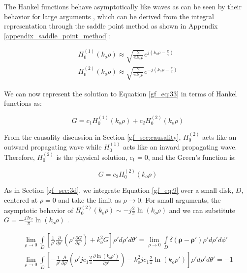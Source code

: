 The Hankel functions behave asymptotically like waves as can be seen by their behavior for large arguments \cite{abramowitz_stegun}, which can be derived from the integral representation through the saddle point method as shown in Appendix \ref{appendix_saddle_point_method}:

\begin{equation}
\begin{gathered}
H_0^{(1)}(k_o\rho) \approx \sqrt{\frac{2}{\pi k_o\rho}}e^{j\left(k_o\rho - \frac{\pi}{4}\right)}\\
H_0^{(2)}(k_o\rho) \approx \sqrt{\frac{2}{\pi k_o\rho}}e^{-j\left(k_o\rho - \frac{\pi}{4}\right)}
\label{gf_eq:36a}
\end{gathered}
\end{equation}
\renewcommand{\baselinestretch}{2} \small\normalsize

We can now represent the solution to Equation \ref{gf_eq:33} in terms of Hankel functions as:

\begin{equation}
G = c_1H_0^{(1)}\left(k_o\rho\right) +c_2H_0^{(2)}\left(k_o\rho\right) 
\label{gf_eq:37}
\end{equation}
\renewcommand{\baselinestretch}{2} \small\normalsize

From the causality discussion in Section \ref{gf_sec:causality}, $H_0^{(2)}$ acts like an outward propagating wave while $H_0^{(1)}$ acts like an inward propagating wave. Therefore, $H_0^{(2)}$ is the physical solution, $c_1=0$, and the Green's function is:

\begin{equation}
G = c_2H_0^{(2)}\left(k_o\rho\right) 
\label{gf_eq:38}
\end{equation}
\renewcommand{\baselinestretch}{2} \small\normalsize

As in Section \ref{gf_sec:3d}, we integrate Equation \ref{gf_eq:9} over a small disk, $D$, centered at $\rho = 0$ and take the limit as $\rho \rightarrow 0$. For small arguments, the asymptotic behavior of $H_0^{(2)}(k_o\rho) \sim -j\frac{2}{\pi}\ln\left({k_o\rho}\right)$ and we can substitute $G = -\frac{j2c_2}{\pi}\ln\left({k_o\rho}\right)$ \cite{abramowitz_stegun}. 

\begin{equation}
\begin{gathered}
\lim_{\rho\to 0}\int\limits_{D} \left[ \frac{1}{\rho'}\frac{\partial}{\partial \rho'}\left(\rho' \frac{\partial G}{\partial \rho'} \right) + k_o^2G\right]\rho' d\rho' d\theta' = \lim_{\rho\to 0}\int\limits_{D} \delta\left(\boldsymbol{\rho}-\boldsymbol{\rho}' \right)\rho' d\rho' d\phi' \\
\lim_{\rho\to 0}\int\limits_{D} \left[ -\frac{1}{\rho'}\frac{\partial}{\partial \rho'}\left(\rho' jc_1\frac{2}{\pi}\frac{\partial \ln(k_o\rho')}{\partial \rho'} \right) - k_o^2jc_1\frac{2}{\pi}\ln(k_o\rho')\right]\rho' d\rho' d\theta' = -1 \\
\end{gathered}
\label{gf_eq:39}
\end{equation}
\renewcommand{\baselinestretch}{2} \small\normalsize

